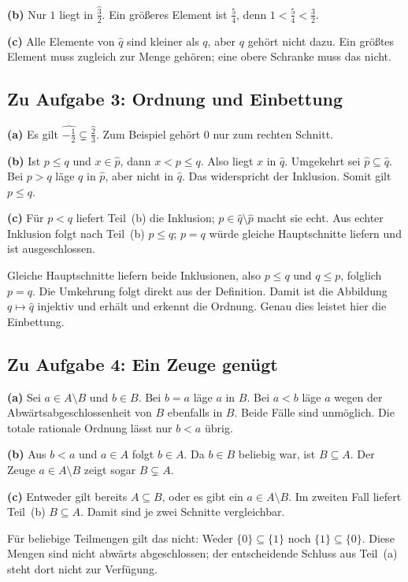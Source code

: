 \textbf{(b)} Nur $1$ liegt in $\widehat{\frac32}$.
Ein größeres Element ist $\frac54$, denn $1<\frac54<\frac32$.

\textbf{(c)} Alle Elemente von $\widehat q$ sind kleiner als $q$,
aber $q$ gehört nicht dazu. Ein größtes Element muss zugleich
zur Menge gehören; eine obere Schranke muss das nicht.

\clearpage
\subsection*{Zu Aufgabe 3: Ordnung und Einbettung}
\textbf{(a)} Es gilt
$\widehat{-\frac12}\subsetneq\widehat{\frac23}$.
Zum Beispiel gehört $0$ nur zum rechten Schnitt.

\textbf{(b)} Ist $p\le q$ und $x\in\widehat p$, dann
$x<p\le q$. Also liegt $x$ in $\widehat q$.
Umgekehrt sei $\widehat p\subseteq\widehat q$.
Bei $p>q$ läge $q$ in $\widehat p$, aber nicht in $\widehat q$.
Das widerspricht der Inklusion. Somit gilt $p\le q$.

\textbf{(c)} Für $p<q$ liefert Teil~(b) die Inklusion;
$p\in\widehat q\setminus\widehat p$ macht sie echt.
Aus echter Inklusion folgt nach Teil~(b) $p\le q$;
$p=q$ würde gleiche Hauptschnitte liefern und ist ausgeschlossen.

Gleiche Hauptschnitte liefern beide Inklusionen, also
$p\le q$ und $q\le p$, folglich $p=q$.
Die Umkehrung folgt direkt aus der Definition.
Damit ist die Abbildung $q\mapsto\widehat q$ injektiv
und erhält und erkennt die Ordnung. Genau dies leistet
hier die Einbettung.

\subsection*{Zu Aufgabe 4: Ein Zeuge genügt}
\textbf{(a)} Sei $a\in A\setminus B$ und $b\in B$.
Bei $b=a$ läge $a$ in $B$.
Bei $a<b$ läge $a$ wegen der Abwärtsabgeschlossenheit von $B$
ebenfalls in $B$. Beide Fälle sind unmöglich.
Die totale rationale Ordnung lässt nur $b<a$ übrig.

\textbf{(b)} Aus $b<a$ und $a\in A$ folgt $b\in A$.
Da $b\in B$ beliebig war, ist $B\subseteq A$.
Der Zeuge $a\in A\setminus B$ zeigt sogar $B\subsetneq A$.

\textbf{(c)} Entweder gilt bereits $A\subseteq B$,
oder es gibt ein $a\in A\setminus B$.
Im zweiten Fall liefert Teil~(b) $B\subseteq A$.
Damit sind je zwei Schnitte vergleichbar.

Für beliebige Teilmengen gilt das nicht:
Weder $\{0\}\subseteq\{1\}$ noch $\{1\}\subseteq\{0\}$.
Diese Mengen sind nicht abwärts abgeschlossen;
der entscheidende Schluss aus Teil~(a) steht dort nicht zur Verfügung.

